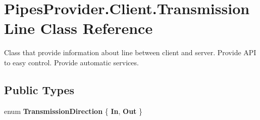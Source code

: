 \hypertarget{class_pipes_provider_1_1_client_1_1_transmission_line}{}\section{Pipes\+Provider.\+Client.\+Transmission\+Line Class Reference}
\label{class_pipes_provider_1_1_client_1_1_transmission_line}


Class that provide information about line between client and server. Provide A\+PI to easy control. Provide automatic services.  


\subsection*{Public Types}
\begin{DoxyCompactItemize}
\item 
\mbox{\label{class_pipes_provider_1_1_client_1_1_transmission_line_adf7f55a4fb34b6503ef72d8b562b2ff5}} 
enum {\bfseries Transmission\+Direction} \{ {\bfseries In}, 
{\bfseries Out}
 \}
\end{DoxyCompactItemize}
